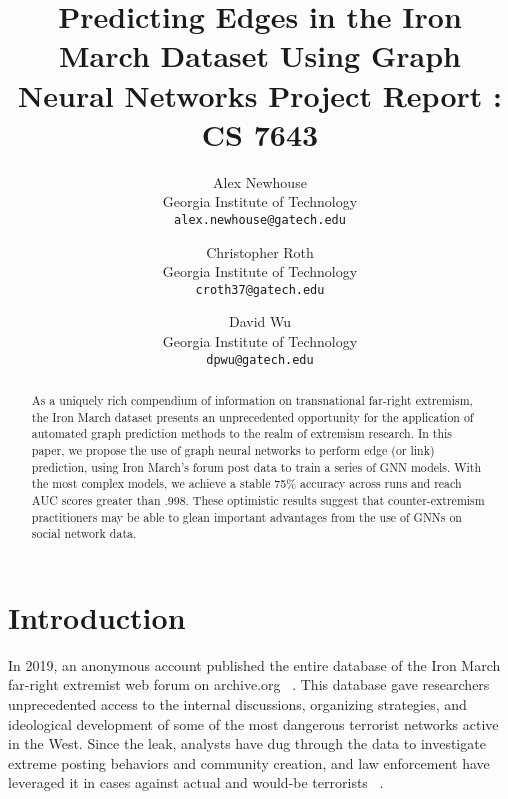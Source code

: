 \documentclass[10pt,twocolumn,letterpaper]{article}
\begin{document}
\title{Predicting Edges in the Iron March Dataset Using Graph Neural Networks
 \large Project Report : CS 7643 }

\author{Alex Newhouse\\
Georgia Institute of Technology\\
{\tt\small alex.newhouse@gatech.edu}
\and
Christopher Roth\\
Georgia Institute of Technology\\
{\tt\small croth37@gatech.edu}
\and
David Wu\\
Georgia Institute of Technology\\
{\tt\small dpwu@gatech.edu}
}

\maketitle

\begin{abstract}
   As a uniquely rich compendium of information on transnational far-right extremism, the Iron March dataset presents an unprecedented opportunity for the application of automated graph prediction methods to the realm of extremism research. In this paper, we propose the use of graph neural networks to perform edge (or link) prediction, using Iron March's forum post data to train a series of GNN models. With the most complex models, we achieve a stable 75\% accuracy across runs and reach AUC scores greater than .998. These optimistic results suggest that counter-extremism practitioners may be able to glean important advantages from the use of GNNs on social network data. 
   
\end{abstract}

\section{Introduction}

In 2019, an anonymous account published the entire database of the Iron March far-right extremist web forum on archive.org ~\cite{bellingcat}. This database gave researchers unprecedented access to the internal discussions, organizing strategies, and ideological development of some of the most dangerous terrorist networks active in the West. Since the leak, analysts have dug through the data to investigate extreme posting behaviors and community creation, and law enforcement have leveraged it in cases against actual and would-be terrorists ~\cite{doj}.
\end{document}
